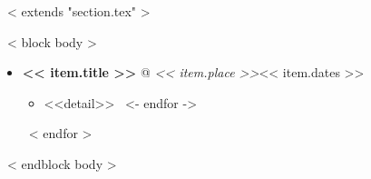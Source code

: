 ~< extends "section.tex" >~

~< block body >~
  \begin{itemize}
    ~< for item in items >~
      \item {\bf << item.title >>} @ {\it << item.place >>}\hfill << item.dates >>
        \begin{itemize}
          ~< for detail in item.details ->~
            \item <<detail>>
            \vspace{0.2em}
          ~<- endfor ->~
        \end{itemize}
    ~< endfor >~
  \end{itemize}
~< endblock body >~

